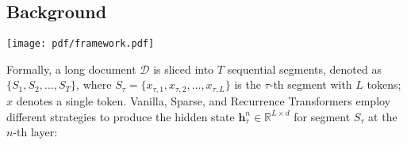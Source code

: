 \documentclass[11pt,a4paper]{article}
\newcommand{\mname}{\textsc{ERNIE-Doc}\xspace}
\begin{document}
\subsection{Background}\label{sec:background}

\begin{figure*}[h]
\centering
\texttt{[image: pdf/framework.pdf]}
\caption{Illustrations of \mname and Recurrence Transformers, where models with three layers take as input a long document $\mathcal{D}$ which is sliced into four segments $\textbf{S}_i, i \in [1,2,3,4]$. \textbf{Recurrence Transformers (upper-right)}: When training on $\textbf{S}_4$, it can only fuse the contextual information of the previous two consecutive segments $\textbf{S}_2,\textbf{S}_3$, since the largest effective context length grows linearly w.r.t the number of layers. \textbf{\mname (lower)}:The effective context length is much larger aided by the enhanced recurrence mechanism (Sec.~\ref{sec:lift-mem}). Thus, $\textbf{S}_4$ can fuse the information of $\textbf{S}_1$ discarded by Recurrence Transformers. Moreover, segments in the retrospective phase contains the contextual information of an entire document, powered by the retrospective feed mechanism (Sec.~\ref{sec:recur-input}).}
\label{fig:framework}
\vspace{-0.5cm}
\end{figure*}

Formally, a long document $\mathcal{D}$ is sliced into $T$ sequential segments, denoted as $\{S_1, S_2, ..., S_T\}$, where $S_{\tau}=\{x_{\tau, 1}, x_{\tau, 2}, ..., x_{\tau, L}\}$ is the $\tau$-th segment with $L$ tokens; $x$ denotes a single token. Vanilla, Sparse, and Recurrence Transformers employ different strategies to produce the hidden state $\mathbf{h}^{n}_{\tau} \in \mathbb{R}^{L \times d}$ for segment $S_{\tau}$ at the $n$-th layer:
\end{document}
